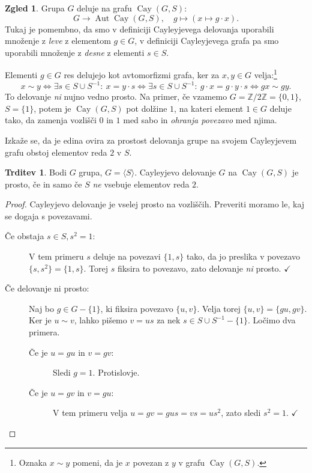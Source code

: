 \documentclass[11pt]{book}
\def\ZZ{\mathbb{Z}}
\DeclareMathOperator\Aut{Aut}
\DeclareMathOperator\Cay{Cay}
\def\kljuka{$\checkmark$}
\theoremstyle{definition}
\theoremstyle{zgled}
\newtheorem*{zgled}{Zgled}
\theoremstyle{odprtproblem}
\theoremstyle{domacanaloga}
\newenvironment{dokaz}
    {\color{siva}\begin{proof}}
    {\end{proof}}
\theoremstyle{izrek}
\newtheorem*{trditev}{Trditev}
\begin{document}
\begin{zgled}
Grupa $G$ deluje na grafu $\Cay(G,S)$:
\[
G \to \Aut \Cay(G,S), \quad g \mapsto (x \mapsto g \cdot x).
\]
Tukaj je pomembno, da smo v definiciji Cayleyjevega delovanja uporabili množenje z {\em leve} z elementom $g \in G$, v definiciji Cayleyjevega grafa pa smo uporabili množenje z {\em desne} z elementi $s \in S$.

Elementi $g \in G$ res delujejo kot avtomorfizmi grafa, ker za $x,y \in G$ velja:\footnote{Oznaka $x \sim y$ pomeni, da je $x$ povezan z $y$ v grafu $\Cay(G,S)$.}
\[
x \sim y \Leftrightarrow \exists s \in S \cup S^{-1} \colon \ x = y \cdot s \Leftrightarrow \exists s \in S \cup S^{-1} \colon \ g \cdot x = g \cdot y \cdot s \Leftrightarrow gx \sim gy.
\]
To delovanje {\em ni} nujno vedno prosto. Na primer, če vzamemo $G = \ZZ/2\ZZ = \{ 0, 1 \}$, $S = \{ 1 \}$, potem je $\Cay(G,S)$ pot dolžine $1$, na kateri element $1 \in G$ deluje tako, da zamenja vozlišči $0$ in $1$ med sabo in {\em ohranja povezavo} med njima.
\end{zgled}

Izkaže se, da je edina ovira za prostost delovanja grupe na svojem Cayleyjevem grafu obstoj elementov reda $2$ v $S$.

\begin{trditev}
Bodi $G$ grupa, $G = \langle S \rangle$. Cayleyjevo delovanje $G$ na $\Cay(G,S)$ je prosto, če in samo če $S$ {\em ne} vsebuje elementov reda $2$.
\end{trditev}

\begin{dokaz}
Cayleyjevo delovanje je vselej prosto na vozliščih. Preveriti moramo le, kaj se dogaja s povezavami.
\begin{description}
\item[Če obstaja $s \in S, s^2 = 1$:] V tem primeru $s$ deluje na povezavi $\{ 1, s \}$ tako, da jo preslika v povezavo $\{ s, s^2 \} = \{ 1, s \}$. Torej $s$ fiksira to povezavo, zato delovanje {\em ni} prosto. \kljuka

\item[Če delovanje ni prosto:] Naj bo $g \in G - \{ 1 \}$, ki fiksira povezavo $\{ u, v \}$. Velja torej $\{ u, v \} = \{ g u, g v \}$. Ker je $u \sim v$, lahko pišemo $v = u s$ za nek $s \in S \cup S^{-1} - \{ 1 \}$. Ločimo dva primera.
    \begin{description}
        \item[Če je $u = gu$ in $v = gv$:] Sledi $g = 1$. Protislovje.
        \item[Če je $u = gv$ in $v = gu$:] V tem primeru velja $u = gv = gus = vs = u s^2$, zato sledi $s^2 = 1$. \kljuka
    \end{description}
\end{description}
\end{dokaz}
\end{document}
